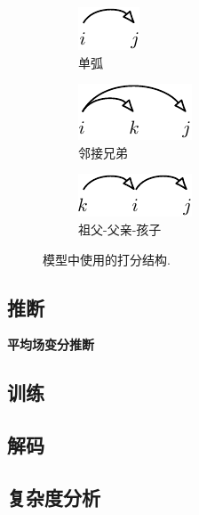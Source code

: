 \begin{figure}[tb]
    \centering
    \begin{subfigure}[b]{0.32\textwidth}
        \centering
        \includegraphics[scale=1.5]{figures/scoring-part/arc.pdf}
        \caption{单弧}
        \label{fig:scoring-part-arc}
    \end{subfigure}
    \begin{subfigure}[b]{0.32\textwidth}
        \centering
        \includegraphics[scale=1.5]{figures/scoring-part/sib.pdf}
        \caption{邻接兄弟}
        \label{fig:scoring-part-sib}
    \end{subfigure}
    \begin{subfigure}[b]{0.32\textwidth}
        \centering
        \includegraphics[scale=1.5]{figures/scoring-part/grd.pdf}
        \caption{祖父-父亲-孩子}
        \label{fig:scoring-part-grd}
    \end{subfigure}
    \caption{模型中使用的打分结构.}
    \label{fig:dep-vi-scoring-part}
\end{figure}

\subsection{推断}

\noindent\textbf{平均场变分推断}

\subsection{训练}

\subsection{解码}

\subsection{复杂度分析}

